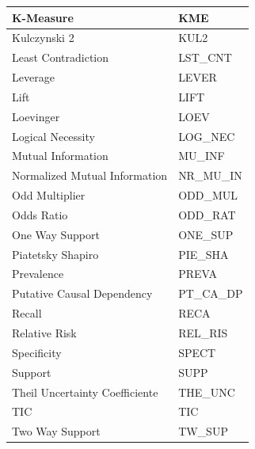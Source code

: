 \begin{table}[!htb]
\begin{tabular}{|l|l|}
K-Measure                      & KME                 \\ \hline
Kulczynski 2                   & KUL2                \\ \hline
Least Contradiction            & LST\_CNT            \\ \hline
Leverage                       & LEVER               \\ \hline
Lift                           & LIFT                \\ \hline
Loevinger                      & LOEV                \\ \hline
Logical Necessity              & LOG\_NEC            \\ \hline
Mutual Information             & MU\_INF             \\ \hline
Normalized Mutual Information  & NR\_MU\_IN          \\ \hline
Odd Multiplier                 & ODD\_MUL            \\ \hline
Odds Ratio                     & ODD\_RAT            \\ \hline
One Way Support                & ONE\_SUP            \\ \hline
Piatetsky Shapiro              & PIE\_SHA            \\ \hline
Prevalence                     & PREVA               \\ \hline
Putative Causal Dependency     & PT\_CA\_DP          \\ \hline
Recall                         & RECA                \\ \hline
Relative Risk                  & REL\_RIS            \\ \hline
Specificity                    & SPECT               \\ \hline
Support                        & SUPP                \\ \hline
Theil Uncertainty Coefficiente & THE\_UNC            \\ \hline
TIC                            & TIC                 \\ \hline
Two Way Support                & TW\_SUP             \\ \hline
\end{tabular}
\end{table}




